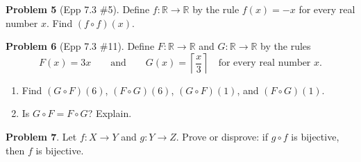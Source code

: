 \documentclass[11pt]{article}
\newcommand{\R}{\mathbb{R}}
\begin{document}
\bigskip

\noindent\textbf{Problem 5} (Epp 7.3 \#5). \;
Define $f \colon \R \to \R$ by the rule $f(x) = -x$ for every real number $x$.
Find $(f \circ f)(x)$.

\bigskip

\noindent\textbf{Problem 6} (Epp 7.3 \#11). \;
Define $F \colon \R \to \R$ and $G \colon \R \to \R$ by the rules
\[
  F(x) = 3x
  \qquad\text{and}\qquad
  G(x) = \left\lceil \frac{x}{3} \right\rceil
  \quad \text{for every real number } x.
\]

\begin{enumerate}[label=\alph*.]
  \item Find $(G \circ F)(6)$, $(F \circ G)(6)$, $(G \circ F)(1)$, and $(F \circ G)(1)$.
  \item Is $G \circ F = F \circ G$? Explain.
\end{enumerate}

\bigskip

\noindent\textbf{Problem 7}. \;
Let $f \colon X \to Y$ and $g \colon Y \to Z$.
Prove or disprove: if $g \circ f$ is bijective, then $f$ is bijective.
\end{document}
